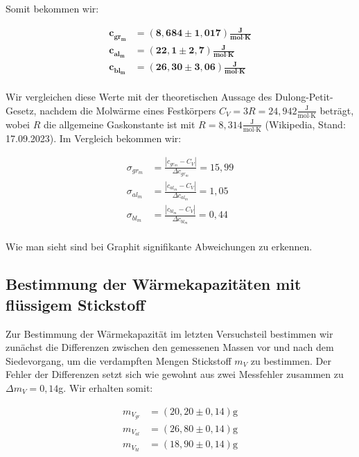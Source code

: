 \documentclass{article}
\begin{document}
Somit bekommen wir:

\begin{equation}
    \begin{split}
        \bm{c_{gr_m}} &= \bm{(8,684 \pm 1,017)} \frac{\textbf{J}}{\textbf{mol} \cdot \textbf{K}} \\
        \bm{c_{al_m}} &= \bm{(22,1 \pm 2,7)} \frac{\textbf{J}}{\textbf{mol} \cdot \textbf{K}} \\
        \bm{c_{bl_m}} &= \bm{(26,30 \pm 3,06)} \frac{\textbf{J}}{\textbf{mol} \cdot \textbf{K}} \\
    \end{split}
\end{equation}

Wir vergleichen diese Werte mit der theoretischen Aussage des Dulong-Petit-Gesetz, nachdem die Molwärme eines Festkörpers $C_V = 3R = 24,942 \frac{\text{J}}{\text{mol} \cdot \text{K}}$ beträgt, wobei $R$ die allgemeine Gaskonstante ist mit $R=8,314 \frac{\text{J}}{\text{mol} \cdot \text{K}}$ (Wikipedia, Stand: 17.09.2023). Im Vergleich bekommen wir:

\begin{equation}
    \begin{split}
        \sigma_{gr_m} &= \frac{|c_{gr_m} - C_V|}{\Delta c_{gr_m}} = 15,99 \\
        \sigma_{al_m} &= \frac{|c_{al_m} - C_V|}{\Delta c_{al_m}} = 1,05 \\
        \sigma_{bl_m} &= \frac{|c_{bl_m} - C_V|}{\Delta c_{bl_m}} = 0,44 \\
    \end{split}
\end{equation}

Wie man sieht sind bei Graphit signifikante Abweichungen zu erkennen.

\newpage
\subsection{Bestimmung der Wärmekapazitäten mit flüssigem Stickstoff}

Zur Bestimmung der Wärmekapazität im letzten Versuchsteil bestimmen wir zunächst die Differenzen zwischen den gemessenen Massen vor und nach dem Siedevorgang, um die verdampften Mengen Stickstoff $m_V$ zu bestimmen. Der Fehler der Differenzen setzt sich wie gewohnt aus zwei Messfehler zusammen zu $\Delta m_V = 0,14$g. Wir erhalten somit:

\begin{equation}
    \begin{split}
        m_{V_{gr}} &= (20,20 \pm 0,14) \text{g} \\
        m_{V_{al}} &= (26,80 \pm 0,14) \text{g} \\
        m_{V_{bl}} &= (18,90 \pm 0,14) \text{g} \\
    \end{split}
\end{equation}
\end{document}
